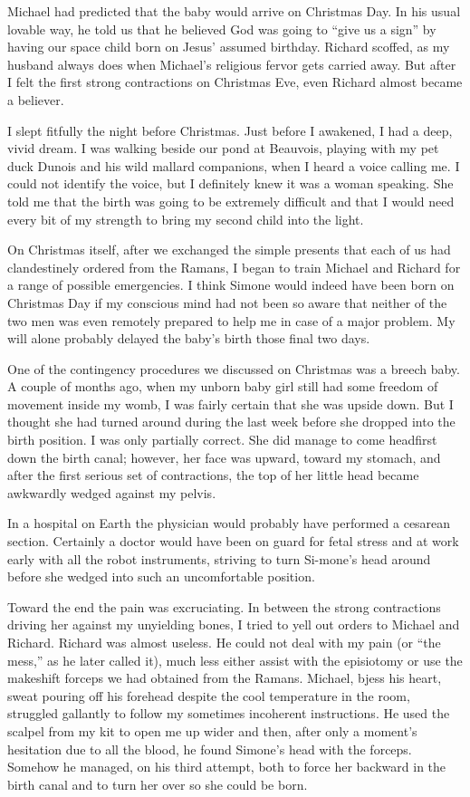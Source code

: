 \documentclass[]{article}
\begin{document}
Michael had predicted that the baby would arrive on Christmas Day. In his usual lovable way, he told us that he believed God was going to “give us a sign” by having our space child born on Jesus’ assumed birthday. Richard scoffed, as my husband always does when Michael’s religious fervor gets carried away. But after I felt the first strong contractions on Christmas Eve, even Richard almost became a believer.

I slept fitfully the night before Christmas. Just before I awakened, I had a deep, vivid dream. I was walking beside our pond at Beauvois, playing with my pet duck Dunois and his wild mallard companions, when I heard a voice calling me. I could not identify the voice, but I definitely knew it was a woman speaking. She told me that the birth was going to be extremely difficult and that I would need every bit of my strength to bring my second child into the light.

On Christmas itself, after we exchanged the simple presents that each of us had clandestinely ordered from the Ramans, I began to train Michael and Richard for a range of possible emergencies. I think Simone would indeed have been born on Christmas Day if my conscious mind had not been so aware that neither of the two men was even remotely prepared to help me in case of a major problem. My will alone probably delayed the baby’s birth those final two days.

One of the contingency procedures we discussed on Christmas was a breech baby. A couple of months ago, when my unborn baby girl still had some freedom of movement inside my womb, I was fairly certain that she was upside down. But I thought she had turned around during the last week before she dropped into the birth position. I was only partially correct. She did manage to come headfirst down the birth canal; however, her face was upward, toward my stomach, and after the first serious set of contractions, the top of her little head became awkwardly wedged against my pelvis.

In a hospital on Earth the physician would probably have performed a cesarean section. Certainly a doctor would have been on guard for fetal stress and at work early with all the robot instruments, striving to turn Si-mone’s head around before she wedged into such an uncomfortable position.

Toward the end the pain was excruciating. In between the strong contractions driving her against my unyielding bones, I tried to yell out orders to Michael and Richard. Richard was almost useless. He could not deal with my pain (or “the mess,” as he later called it), much less either assist with the episiotomy or use the makeshift forceps we had obtained from the Ramans. Michael, bjess his heart, sweat pouring off his forehead despite the cool temperature in the room, struggled gallantly to follow my sometimes incoherent instructions. He used the scalpel from my kit to open me up wider and then, after only a moment’s hesitation due to all the blood, he found Simone’s head with the forceps. Somehow he managed, on his third attempt, both to force her backward in the birth canal and to turn her over so she could be born.
\end{document}
